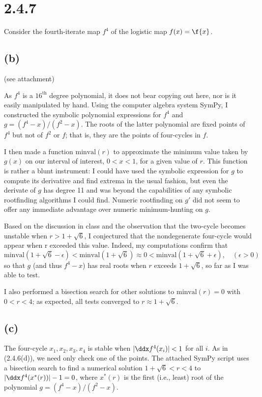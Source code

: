\documentclass{article}
\newcommand{\newc}{\newcommand}
\begin{document}
\section{2.4.7} 
Consider the fourth-iterate map $f^4$ of the logistic map  $f(x)=\f{x}$.

\subsection*{(b)} (see attachment)

As $f^4$ is a $16^{\text{th}}$ degree polynomial, it does not bear copying out here, nor is it easily manipulated by hand. Using the computer algebra system SymPy, I constructed the symbolic polynomial expressions for $f^4$ and $g=(f^4-x)/(f^2-x)$. The roots of the latter polynomial are fixed points of $f^4$ but not of $f^2$ or $f$; that is, they are the points of four-cycles in $f$.

I then made a function \newc{\mv}{\mathrm{minval}} $\mv(r)$ to approximate the minimum value taken by $g(x)$ on our interval of interest, $0<x<1$, for a given value of $r$. This function is rather a blunt instrument: I could have used the symbolic expression for $g$ to compute its derivative and find extrema in the usual fashion, but even the derivate of $g$ has degree 11 and was beyond the capabilities of any symbolic rootfinding algorithms I could find. Numeric rootfinding on $g'$ did not seem to offer any immediate advantage over numeric minimum-hunting on $g$.

Based on the discussion in class and the observation that the two-cycle becomes unstable when $r>1+\sqrt6$, I conjectured that the nondegenerate four-cycle would appear when r exceeded this value. Indeed, my computations confirm that 
$$\mv(1+\sqrt6-\epsilon)<\mv(1+\sqrt6)\approx0<\mv(1+\sqrt6+\epsilon),\quad(\epsilon>0)$$
so that $g$ (and thus $f^4-x$) has real roots when $r$ exceeds $1+\sqrt6$, so far as I was able to test.

I also performed a bisection search for other solutions to $\mv(r)=0$ with $0<r<4$; as expected, all tests converged to $r\approx 1+\sqrt6$.

\subsection*{(c)}
The four-cycle $x_1,x_2,x_3,x_4$ is stable when $|\ddx f^4(x_i)|<1$ for all $i$. As in (2.4.6(d)), we need only check one of the points. The attached SymPy script uses a bisection search to find a numerical solution $1+\sqrt6<r<4$ to $|\ddx f^4(x^*(r))|-1=0$, where $x^*(r)$ is the first (i.e., least) root of the polynomial $g=(f^4-x)/(f^2-x)$.
\end{document}
